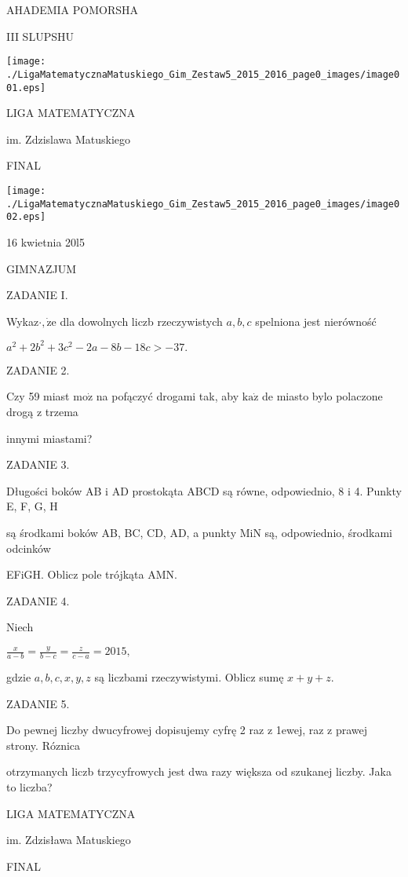 \documentclass[a4paper,12pt]{article}
\begin{document}
AHADEMIA POMORSHA

III SLUPSHU
\begin{center}
\texttt{[image: ./LigaMatematycznaMatuskiego\_Gim\_Zestaw5\_2015\_2016\_page0\_images/image001.eps]}
\end{center}
LIGA MATEMATYCZNA

im. Zdzislawa Matuskiego

FINAL
\begin{center}
\texttt{[image: ./LigaMatematycznaMatuskiego\_Gim\_Zestaw5\_2015\_2016\_page0\_images/image002.eps]}
\end{center}
16 kwietnia 20l5

GIMNAZJUM

ZADANIE I.

Wykaz$\cdot, \dot{\mathrm{z}}\mathrm{e}$ dla dowolnych liczb rzeczywistych $a, b, c$ spelniona jest nierówność

$a^{2}+2b^{2}+3c^{2}-2a-8b-18c>-37.$

ZADANIE 2.

Czy 59 miast $\mathrm{m}\mathrm{o}\dot{\mathrm{z}}$ na pofączyć drogami tak, aby $\mathrm{k}\mathrm{a}\dot{\mathrm{z}}$ de miasto bylo polaczone drogą z trzema

innymi miastami?

ZADANIE 3.

Długości boków AB i AD prostokąta ABCD są równe, odpowiednio, 8 i 4. Punkty E, F, G, H

są środkami boków AB, BC, CD, AD, a punkty MiN są, odpowiednio, środkami odcinków

EFiGH. Oblicz pole trójkąta AMN.

ZADANIE 4.

Niech

$\displaystyle \frac{x}{a-b}=\frac{y}{b-c}=\frac{z}{c-a}=2015,$

gdzie $a, b, c, x, y, z$ są liczbami rzeczywistymi. Oblicz sumę $x+y+z.$

ZADANIE 5.

Do pewnej liczby dwucyfrowej dopisujemy cyfrę 2 raz z 1ewej, raz z prawej strony. Róznica

otrzymanych liczb trzycyfrowych jest dwa razy większa od szukanej liczby. Jaka to liczba?






LIGA MATEMATYCZNA

im. Zdzisława Matuskiego

FINAL
\end{document}
